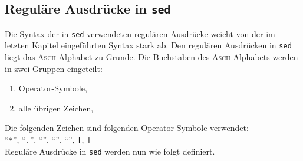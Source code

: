 \subsection{Regul\"are Ausdr\"ucke in \texttt{sed}}
Die Syntax der in \texttt{sed} verwendeten regul\"aren Ausdr\"ucke weicht von der
im letzten Kapitel eingef\"uhrten Syntax stark ab.  Den regul\"aren Ausdr\"ucken in \texttt{sed}
liegt das \textsc{Ascii}-Alphabet zu Grunde.  Die Buchstaben des \textsc{Ascii}-Alphabets
werden in zwei Gruppen eingeteilt:
\begin{enumerate}
\item Operator-Symbole,
\item alle \"ubrigen Zeichen,
\end{enumerate}
Die folgenden Zeichen sind folgenden Operator-Symbole verwendet: 
\\[0.2cm]
\hspace*{1.3cm}
   ``\texttt{*}'', ``\texttt{.}'', ``\texttt{}'', ``\texttt{}'', 
   ``\texttt{}'', \texttt{[}, \texttt{]}
\\[0.2cm]
Regul\"are Ausdr\"ucke in \texttt{sed} werden nun wie folgt definiert.
